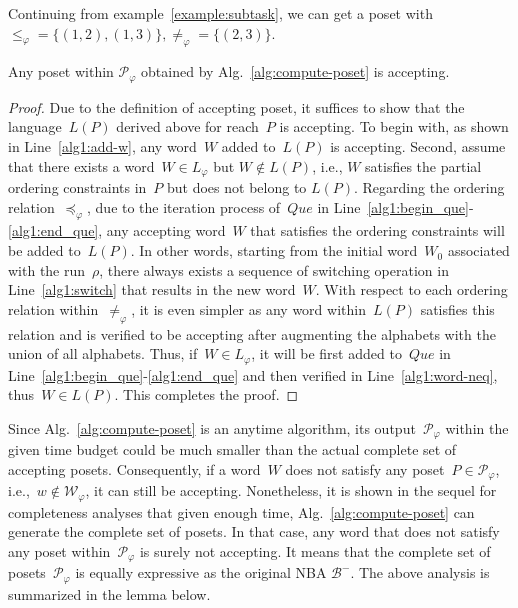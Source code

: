 \begin{example}
	Continuing from example~\ref{example:subtask}, we can get a poset with 
	$\leq_\varphi=\{(1,2),(1,3)\},\neq_{\varphi}=\{(2,3)\}$.
\end{example}

\begin{lemma}\label{lemma:accepting-poset}
Any poset within $\mathcal{P}_{\varphi}$ obtained by Alg.~\ref{alg:compute-poset}
is accepting.
\end{lemma}
\begin{proof}
Due to the definition of accepting poset, it suffices to show that the
language~$L(P)$ derived above for reach~$P$ is accepting.
To begin with, as shown in Line~\ref{alg1:add-w}, any word~$W$ added to~$L(P)$
is accepting.
Second, assume that there exists a word~$W\in L_\varphi$ but $W\notin L(P)$, i.e.,
$W$ satisfies the partial ordering constraints in~$P$ but does not belong to $L(P)$.
Regarding the ordering relation~$\preceq_{\varphi}$,
due to the iteration process of~$Que$ in Line~\ref{alg1:begin_que}-\ref{alg1:end_que},
any accepting word~$W$ that satisfies the ordering constraints will be added
to~$L(P)$.
In other words, starting from the initial word~$W_0$ associated with the run~$\rho$,
there always exists a sequence of switching operation in Line~\ref{alg1:switch} that results
in the new word~$W$.
With respect to each ordering relation within~$\neq_{\varphi}$, it is even simpler
as any word within~$L(P)$ satisfies this relation and is verified to be accepting
after augmenting the alphabets with the union of all alphabets.
Thus, if~$W\in L_{\varphi}$, it will be first added to~$Que$ in
Line~\ref{alg1:begin_que}-\ref{alg1:end_que} and then
verified in Line~\ref{alg1:word-neq}, thus~$W\in L(P)$. This completes the proof.
\end{proof}



Since Alg.~\ref{alg:compute-poset} is an anytime algorithm,
its output~$\mathcal{P}_{\varphi}$ within the given time budget
could be much smaller than the actual complete set of accepting posets.
Consequently, if a word~$W$ does not satisfy
any poset~$P\in \mathcal{P}_{\varphi}$, i.e.,~$w\notin \mathcal{W}_{\varphi}$,
it can still be accepting.
Nonetheless, it is shown in the sequel for completeness analyses that
given enough time, Alg.~\ref{alg:compute-poset} can generate
the complete set of posets.
In that case, any word that does not satisfy any poset
within~$\mathcal{P}_{\varphi}$ is surely not accepting.
It means that the complete set of posets~$\mathcal{P}_{\varphi}$ is
equally expressive as the original NBA $\mathcal{B}^-$.
The above analysis is summarized in the lemma below.

